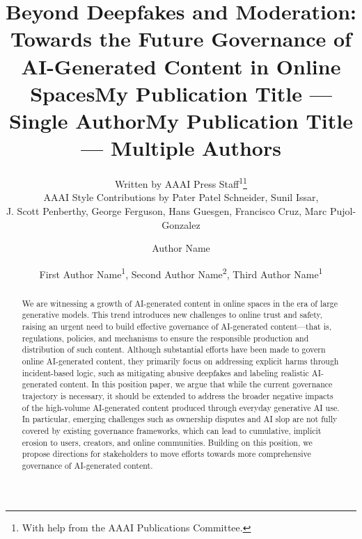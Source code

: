 \documentclass[letterpaper]{article} %
\title{Beyond Deepfakes and Moderation: Towards the Future Governance of AI-Generated Content in Online Spaces}
\author{
    Written by AAAI Press Staff\textsuperscript{\rm 1}\thanks{With help from the AAAI Publications Committee.}\\
    AAAI Style Contributions by Pater Patel Schneider,
    Sunil Issar,\\
    J. Scott Penberthy,
    George Ferguson,
    Hans Guesgen,
    Francisco Cruz\equalcontrib,
    Marc Pujol-Gonzalez\equalcontrib
}
\title{My Publication Title --- Single Author}
\author {
    Author Name
}
\title{My Publication Title --- Multiple Authors}
\author {
    First Author Name\textsuperscript{\rm 1},
    Second Author Name\textsuperscript{\rm 2},
    Third Author Name\textsuperscript{\rm 1}
}
\begin{document}
\maketitle

\begin{abstract}
We are witnessing a growth of AI-generated content in online spaces in the era of large generative models. This trend introduces new challenges to online trust and safety, raising an urgent need to build effective governance of AI-generated content---that is, regulations, policies, and mechanisms to ensure the responsible production and distribution of such content. Although substantial efforts have been made to govern online AI-generated content, they primarily focus on addressing explicit harms through incident-based logic, such as mitigating abusive deepfakes and labeling realistic AI-generated content. In this position paper, we argue that while the current governance trajectory is necessary, it should be extended to address the broader negative impacts of the high-volume AI-generated content produced through everyday generative AI use. In particular, emerging challenges such as ownership disputes and AI slop are not fully covered by existing governance frameworks, which can lead to cumulative, implicit erosion to users, creators, and online communities. Building on this position, we propose directions for stakeholders to move efforts towards more comprehensive governance of AI-generated content.
\end{abstract}











% 
\end{document}
